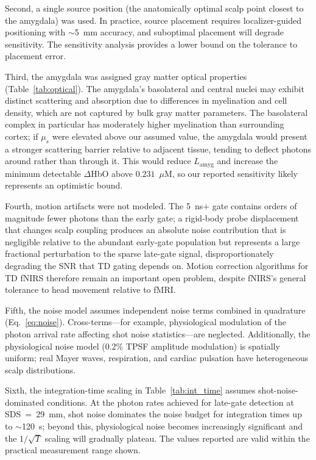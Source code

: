 \documentclass[11pt,a4paper]{article}
\begin{document}
Second, a single source position (the anatomically optimal scalp point closest to the amygdala) was used. In practice, source placement requires localizer-guided positioning with $\sim$5~mm accuracy, and suboptimal placement will degrade sensitivity. The sensitivity analysis provides a lower bound on the tolerance to placement error.

Third, the amygdala was assigned gray matter optical properties (Table~\ref{tab:optical}). The amygdala's basolateral and central nuclei may exhibit distinct scattering and absorption due to differences in myelination and cell density, which are not captured by bulk gray matter parameters. The basolateral complex in particular has moderately higher myelination than surrounding cortex; if $\mu_s$ were elevated above our assumed value, the amygdala would present a stronger scattering barrier relative to adjacent tissue, tending to deflect photons around rather than through it. This would reduce $L_\mathrm{amyg}$ and increase the minimum detectable $\Delta$HbO above $0.231$~$\mu$M, so our reported sensitivity likely represents an optimistic bound.

Fourth, motion artifacts were not modeled. The 5~ns$+$ gate contains orders of magnitude fewer photons than the early gate; a rigid-body probe displacement that changes scalp coupling produces an absolute noise contribution that is negligible relative to the abundant early-gate population but represents a large fractional perturbation to the sparse late-gate signal, disproportionately degrading the SNR that TD gating depends on. Motion correction algorithms for TD fNIRS therefore remain an important open problem, despite fNIRS's general tolerance to head movement relative to fMRI.

Fifth, the noise model assumes independent noise terms combined in quadrature (Eq.~\ref{eq:noise}). Cross-terms---for example, physiological modulation of the photon arrival rate affecting shot noise statistics---are neglected. Additionally, the physiological noise model (0.2\% TPSF amplitude modulation) is spatially uniform; real Mayer waves, respiration, and cardiac pulsation have heterogeneous scalp distributions.

Sixth, the integration-time scaling in Table~\ref{tab:int_time} assumes shot-noise-dominated conditions. At the photon rates achieved for late-gate detection at SDS~=~29~mm, shot noise dominates the noise budget for integration times up to $\sim$120~s; beyond this, physiological noise becomes increasingly significant and the $1/\sqrt{T}$ scaling will gradually plateau. The values reported are valid within the practical measurement range shown.
\end{document}
